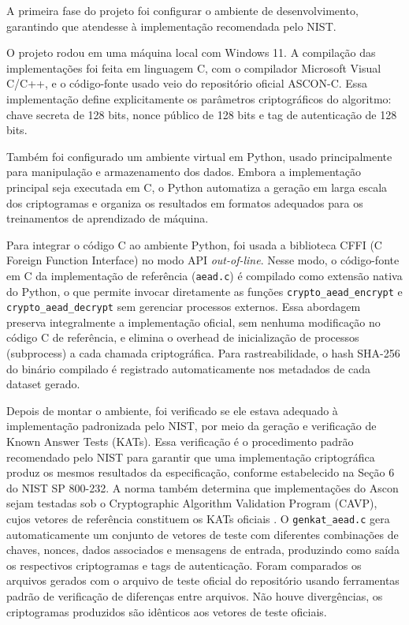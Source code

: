 A primeira fase do projeto foi configurar o ambiente de desenvolvimento, garantindo que atendesse à implementação recomendada pelo NIST.

O projeto rodou em uma máquina local com Windows 11. A compilação das implementações foi feita em linguagem C, com o compilador Microsoft Visual C/C++, e o código-fonte usado veio do repositório oficial ASCON-C. Essa implementação define explicitamente os parâmetros criptográficos do algoritmo: chave secreta de 128 bits, nonce público de 128 bits e tag de autenticação de 128 bits.


Também foi configurado um ambiente virtual em Python, usado principalmente para manipulação e armazenamento dos dados. Embora a implementação principal seja executada em C, o Python automatiza a geração em larga escala dos criptogramas e organiza os resultados em formatos adequados para os treinamentos de aprendizado de máquina.


Para integrar o código C ao ambiente Python, foi usada a biblioteca CFFI (C Foreign Function Interface) no modo API \emph{out-of-line}. Nesse modo, o código-fonte em C da implementação de referência (\texttt{aead.c}) é compilado como extensão nativa do Python, o que permite invocar diretamente as funções \texttt{crypto\_aead\_encrypt} e \texttt{crypto\_aead\_decrypt} sem gerenciar processos externos. Essa abordagem preserva integralmente a implementação oficial, sem nenhuma modificação no código C de referência, e elimina o overhead de inicialização de processos (subprocess) a cada chamada criptográfica. Para rastreabilidade, o hash SHA-256 do binário compilado é registrado automaticamente nos metadados de cada dataset gerado.

Depois de montar o ambiente, foi verificado se ele estava adequado à implementação padronizada pelo NIST, por meio da geração e verificação de Known Answer Tests (KATs). Essa verificação é o procedimento padrão recomendado pelo NIST para garantir que uma implementação criptográfica produz os mesmos resultados da especificação, conforme estabelecido na Seção 6 do NIST SP 800-232. A norma também determina que implementações do Ascon sejam testadas sob o Cryptographic Algorithm Validation Program (CAVP), cujos vetores de referência constituem os KATs oficiais \cite{nist_sp800232_2025}.
O \texttt{genkat\_aead.c} gera automaticamente um conjunto de vetores de teste com diferentes combinações de chaves, nonces, dados associados e mensagens de entrada, produzindo como saída os respectivos criptogramas e tags de autenticação.
Foram comparados os arquivos gerados com o arquivo de teste oficial do repositório usando ferramentas padrão de verificação de diferenças entre arquivos. Não houve divergências, os criptogramas produzidos são idênticos aos vetores de teste oficiais.

